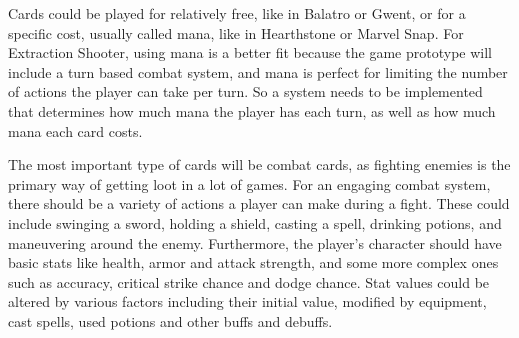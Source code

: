 Cards could be played for relatively free, like in Balatro\cite{balatro2024} or Gwent\cite{gwent2018}, or for a specific cost, usually called mana, like in Hearthstone\cite{hearthstone2014} or Marvel Snap\cite{marvelSnap2022}. For Extraction Shooter, using mana is a better fit because the game prototype will include a turn based combat system, and mana is perfect for limiting the number of actions the player can take per turn. So a system needs to be implemented that determines how much mana the player has each turn, as well as how much mana each card costs.

The most important type of cards will be combat cards, as fighting enemies is the primary way of getting loot in a lot of games. For an engaging combat system, there should be a variety of actions a player can make during a fight. These could include swinging a sword, holding a shield, casting a spell, drinking potions, and maneuvering around the enemy. Furthermore, the player's character should have basic stats like health, armor and attack strength, and some more complex ones such as accuracy, critical strike chance and dodge chance. Stat values could be altered by various factors including their initial value, modified by equipment, cast spells, used potions and other buffs and debuffs.